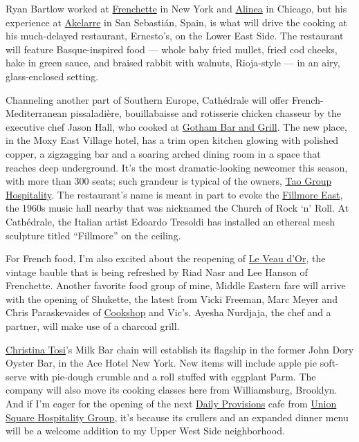 Ryan Bartlow worked at
\href{https://www.nytimes3xbfgragh.onion/2018/07/10/dining/frenchette-review-restaurant-tribeca.html}{Frenchette}
in New York and
\href{https://www.nytimes3xbfgragh.onion/2016/05/04/dining/alinea-restaurant-chicago-grant-achatz.html}{Alinea}
in Chicago, but his experience at
\href{https://akelarre.net/en/restaurant/}{Akelarre} in San Sebastián,
Spain, is what will drive the cooking at his much-delayed restaurant,
Ernesto's, on the Lower East Side. The restaurant will feature
Basque-inspired food --- whole baby fried mullet, fried cod cheeks, hake
in green sauce, and braised rabbit with walnuts, Rioja-style --- in an
airy, glass-enclosed setting.

Channeling another part of Southern Europe, Cathédrale will offer
French-Mediterranean pissaladière, bouillabaisse and rotisserie chicken
chasseur by the executive chef Jason Hall, who cooked at
\href{https://www.gothambarandgrill.com/}{Gotham Bar and Grill}. The new
place, in the Moxy East Village hotel, has a trim open kitchen glowing
with polished copper, a zigzagging bar and a soaring arched dining room
in a space that reaches deep underground. It's the most dramatic-looking
newcomer this season, with more than 300 seats; such grandeur is typical
of the owners, \href{https://www.taogroup.com/}{Tao Group Hospitality}.
The restaurant's name is meant in part to evoke the
\href{https://www.atlasobscura.com/places/the-fillmore-east-new-york-new-york}{Fillmore
East}, the 1960s music hall nearby that was nicknamed the Church of Rock
`n' Roll. At Cathédrale, the Italian artist Edoardo Tresoldi has
installed an ethereal mesh sculpture titled ``Fillmore'' on the ceiling.

For French food, I'm also excited about the reopening of
\href{https://www.nytimes3xbfgragh.onion/2019/07/16/dining/frenchette-le-veau-dor.html}{Le
Veau d'Or}, the vintage bauble that is being refreshed by Riad Nasr and
Lee Hanson of Frenchette. Another favorite food group of mine, Middle
Eastern fare will arrive with the opening of Shukette, the latest from
Vicki Freeman, Marc Meyer and Chris Paraskevaides of
\href{https://www.cookshopny.com/}{Cookshop} and Vic's. Ayesha Nurdjaja,
the chef and a partner, will make use of a charcoal grill.

\href{https://www.nytimes3xbfgragh.onion/2019/02/12/dining/christina-tosi-milk-bar.html}{Christina
Tosi}'s Milk Bar chain will establish its flagship in the former John
Dory Oyster Bar, in the Ace Hotel New York. New items will include apple
pie soft-serve with pie-dough crumble and a roll stuffed with eggplant
Parm. The company will also move its cooking classes here from
Williamsburg, Brooklyn. And if I'm eager for the opening of the next
\href{https://www.nytimes3xbfgragh.onion/2017/02/07/dining/daily-provisions-nyc-restaurant-news.html}{Daily
Provisions} cafe from \href{https://www.ushgnyc.com/}{Union Square
Hospitality Group}, it's because its crullers and an expanded dinner
menu will be a welcome addition to my Upper West Side neighborhood.

